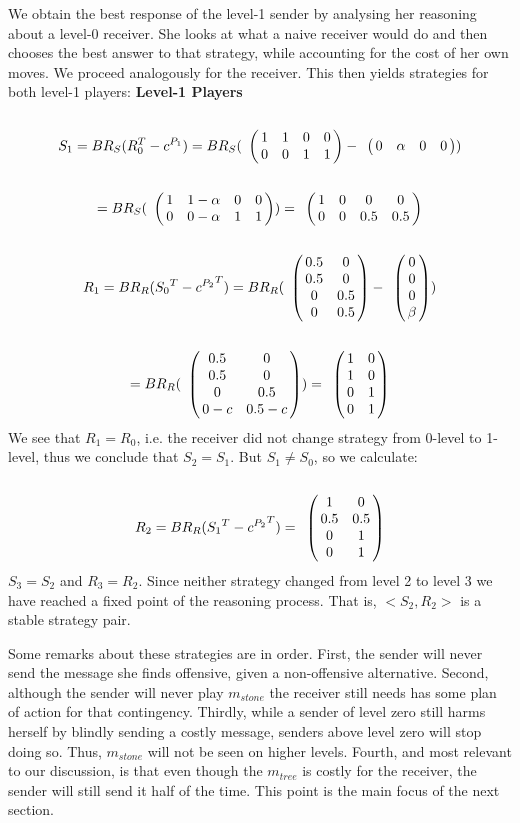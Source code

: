 \documentclass[10pt,a4paper]{article}
\begin{document}
We obtain the best response of the level-1 sender by analysing her reasoning about a level-0 receiver. She looks at what a naive receiver would do and then chooses the best answer to that strategy, while accounting for the cost of her own moves. We proceed analogously for the receiver. This then yields strategies for both level-1 players:
\textbf{Level-1 Players}\\
\begin{equation*}
S_1= BR_S(R^T_0-c^{P_1})=
BR_S(
\bordermatrix{
            & & & &    \cr
 &       1 &         1 & 0       & 0 \cr
 &       0 &         0 & 1      & 1
 }
-
\bordermatrix{
            & & & &    \cr
 &       0 &         \alpha & 0       & 0 \cr
 }
)
\end{equation*}
\begin{equation*}
=BR_S(
\bordermatrix{
                & & & &    \cr
     &       1 &         1-\alpha & 0       & 0 \cr
     &       0 &         0-\alpha & 1      & 1
 }
 )
=
\bordermatrix{
                 & & & &    \cr
      &       1 &         0 & 0       & 0 \cr
      &       0 &         0 & 0.5      & 0.5
  }
\end{equation*}
\begin{equation*}
R_1=BR_R({S_0}^T-{c^{P_2}}^T)=
BR_R(
\bordermatrix{
            &  & \cr
    & 0.5 & 0 \cr
     & 0.5 & 0 \cr
     & 0 & 0.5 \cr
     & 0 & 0.5 \cr
 }
-
\bordermatrix{
  & \cr
    & 0 \cr
     & 0 \cr
     & 0 \cr
     & \beta \cr
 }
)
\end{equation*}
\begin{equation*}
=
BR_R(
\bordermatrix{
            &  & \cr
    & 0.5 & 0 \cr
     & 0.5 & 0 \cr
     & 0 & 0.5 \cr
     & 0-c & 0.5-c \cr
 }
 )
=
\bordermatrix{
            &  & \cr
    & 1 & 0 \cr
     & 1 & 0 \cr
     & 0 & 1 \cr
     & 0 & 1 \cr
 }
\end{equation*}
We see that $R_1=R_0$, i.e. the receiver did not change strategy from 0-level to 1-level, thus we conclude that $S_2=S_1$. But $S_1 \neq S_0$, so we calculate:
\begin{equation*}
R_2=BR_R({S_1}^T-{c^{P_2}}^T)=
\bordermatrix{
            &  & \cr
    & 1 & 0 \cr
     & 0.5 & 0.5 \cr
     & 0 & 1 \cr
     & 0 & 1 \cr
 }
\end{equation*}
$S_3=S_2$ and $R_3=R_2$. Since neither strategy changed from level 2 to level 3 we have reached a fixed point of the reasoning process. That is,  $<S_2,R_2>$ is a stable strategy pair.

Some remarks about these strategies are in order. First, the sender will never send the message she finds offensive, given a non-offensive alternative. Second, although the sender will never play $m_{stone}$ the receiver still needs has some plan of action for that contingency. Thirdly, while a sender of level zero still harms herself by blindly sending a costly message, senders above level zero will stop doing so. Thus, $m_{stone}$ will not be seen on higher levels. Fourth, and most relevant to our discussion, is that even though the $m_{tree}$ is costly for the receiver, the sender will still send it half of the time. This point is the main focus of the next section.
\end{document}
